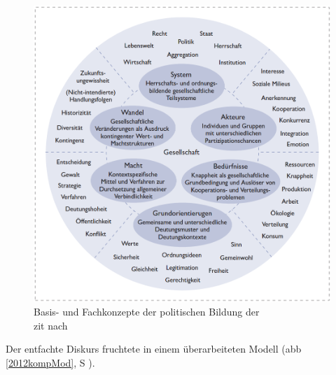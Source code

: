 \begin{figure}[htb]
    \centering
    \includegraphics[width=1\linewidth]{Autorengruppe p. 170 nach GloeOeftering p. 109.png}
    \caption{Basis- und Fachkonzepte der politischen Bildung der \\ \textcite[170]{Besand.2011} \gls{zit} nach \textcite[109]{Gloe2020}}
    \label{2011kompMod}
\end{figure}

Der entfachte Diskurs %
fruchtete in einem überarbeiteten Modell (\gls{abb} \ref{2012kompMod}, \gls{S} \pageref{2012kompMod}).%

